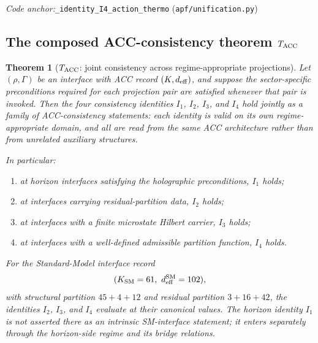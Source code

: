 \documentclass[11pt]{article}
\theoremstyle{plain}
\newtheorem{theorem}{Theorem}[section]
\theoremstyle{definition}
\theoremstyle{remark}
\newcommand{\coderef}[2]{\par\noindent\textit{Code anchor:}\quad\texttt{#1} (\texttt{#2})}
\begin{document}
\coderef{\_identity\_I4\_action\_thermo}{apf/unification.py}

\bigskip

\subsection{The composed ACC-consistency theorem \texorpdfstring{$T_{\rm ACC}$}{T\_ACC}}\label{supp:D5}

\begin{theorem}[$T_{\rm ACC}$: joint consistency across regime-appropriate projections]\label{thm:T_ACC}
Let $(\rho,\Gamma)$ be an interface with ACC record $(K, d_{\rm eff})$, and suppose the sector-specific preconditions required for each projection pair are satisfied whenever that pair is invoked.  Then the four consistency identities $I_1$, $I_2$, $I_3$, and $I_4$ hold \emph{jointly as a family of ACC-consistency statements}: each identity is valid on its own regime-appropriate domain, and all are read from the same ACC architecture rather than from unrelated auxiliary structures.

In particular:
\begin{enumerate}[leftmargin=2.5em,label=\textup{(\roman*)}]
  \item at horizon interfaces satisfying the holographic preconditions, $I_1$ holds;
  \item at interfaces carrying residual-partition data, $I_2$ holds;
  \item at interfaces with a finite microstate Hilbert carrier, $I_3$ holds;
  \item at interfaces with a well-defined admissible partition function, $I_4$ holds.
\end{enumerate}

For the Standard-Model interface record
\[
  (K_{\rm SM} = 61,\ d_{\rm eff}^{\rm SM} = 102),
\]
with structural partition $45 + 4 + 12$ and residual partition $3 + 16 + 42$, the identities $I_2$, $I_3$, and $I_4$ evaluate at their canonical values.  The horizon identity $I_1$ is not asserted there as an intrinsic SM-interface statement; it enters separately through the horizon-side regime and its bridge relations.
\end{theorem}
\end{document}
